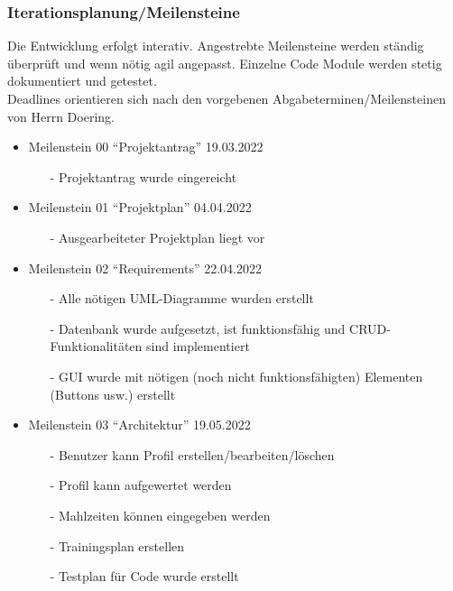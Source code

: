 \documentclass[12pt,a4paper,onecolumn]{article}
\begin{document}
\subsubsection{Iterationsplanung/Meilensteine}
Die Entwicklung erfolgt interativ. Angestrebte Meilensteine werden ständig überprüft und wenn nötig agil angepasst.
Einzelne Code Module werden stetig dokumentiert und getestet.\\
Deadlines orientieren sich nach den vorgebenen Abgabeterminen/Meilensteinen von Herrn Doering.\\

\begin{itemize}
    \item Meilenstein 00 ``Projektantrag'' 19.03.2022
    \begin{itemize}
        \item[-] Projektantrag wurde eingereicht
    \end{itemize}
    
    \item Meilenstein 01 ``Projektplan'' 04.04.2022
    \begin{itemize}
        \item[-] Ausgearbeiteter Projektplan liegt vor
    \end{itemize}
  
    \item Meilenstein 02 ``Requirements'' 22.04.2022
    \begin{itemize}
        \item[-] Alle nötigen UML-Diagramme wurden erstellt
        \item[-] Datenbank wurde aufgesetzt, ist funktionsfähig und CRUD-Funktionalitäten sind implementiert
        \item[-] GUI wurde mit nötigen (noch nicht funktionsfähigten) Elementen (Buttons usw.) erstellt
    \end{itemize}
  
    \item Meilenstein 03 ``Architektur'' 19.05.2022
    \begin{itemize}
        \item[-] Benutzer kann Profil erstellen/bearbeiten/löschen
        \item[-] Profil kann aufgewertet werden
        \item[-] Mahlzeiten können eingegeben werden
        \item[-] Trainingsplan erstellen
        \item[-] Testplan für Code wurde erstellt
    \end{itemize}
    

\end{itemize}
\end{document}
